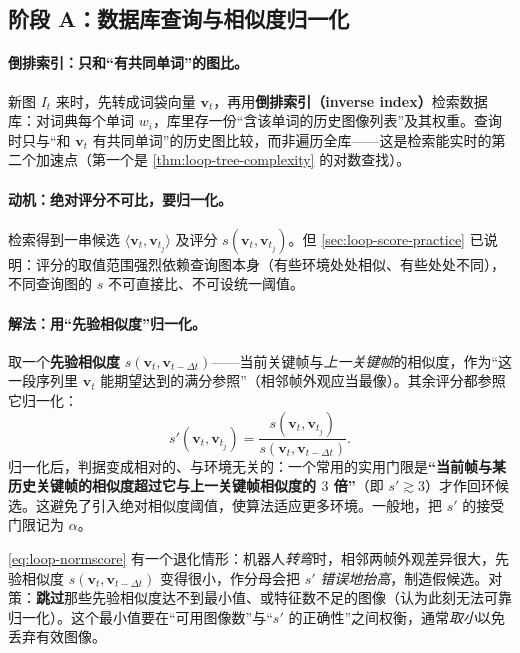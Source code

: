 \subsection{阶段 A：数据库查询与相似度归一化}
\label{sec:loop-stageA}

\paragraph{倒排索引：只和“有共同单词”的图比。}
新图 $I_t$ 来时，先转成词袋向量 $\boldsymbol v_t$，再用\textbf{倒排索引（inverse index）}检索数据库\cite{galvez2012bags}：对词典每个单词 $w_i$，库里存一份“含该单词的历史图像列表”及其权重。查询时只与“和 $\boldsymbol v_t$ 有共同单词”的历史图比较，而非遍历全库——这是检索能实时的第二个加速点（第一个是 \cref{thm:loop-tree-complexity} 的对数查找）。

\paragraph{动机：绝对评分不可比，要归一化。}
检索得到一串候选 $\langle\boldsymbol v_t,\boldsymbol v_{t_j}\rangle$ 及评分 $s(\boldsymbol v_t,\boldsymbol v_{t_j})$。但 \cref{sec:loop-score-practice} 已说明：评分的取值范围强烈依赖查询图本身（有些环境处处相似、有些处处不同），不同查询图的 $s$ 不可直接比、不可设统一阈值。

\paragraph{解法：用“先验相似度”归一化。}
取一个\textbf{先验相似度} $s(\boldsymbol v_t,\boldsymbol v_{t-\Delta t})$——当前关键帧与\emph{上一关键帧}的相似度，作为“这一段序列里 $\boldsymbol v_t$ 能期望达到的满分参照”（相邻帧外观应当最像）。其余评分都参照它归一化\cite{galvez2012bags,gaoxiang2019slam14}：
\begin{equation}
  s'(\boldsymbol v_t,\boldsymbol v_{t_j})=\frac{s(\boldsymbol v_t,\boldsymbol v_{t_j})}{s(\boldsymbol v_t,\boldsymbol v_{t-\Delta t})}.
  \label{eq:loop-normscore}
\end{equation}
归一化后，判据变成相对的、与环境无关的：一个常用的实用门限是\textbf{“当前帧与某历史关键帧的相似度超过它与上一关键帧相似度的 $3$ 倍”}（即 $s'\gtrsim 3$）才作回环候选\cite{gaoxiang2019slam14}。这避免了引入绝对相似度阈值，使算法适应更多环境。一般地，把 $s'$ 的接受门限记为 $\alpha$。

\begin{pitfall}[陷阱：转弯时先验相似度会“塌方”]
\cref{eq:loop-normscore} 有一个退化情形\cite{galvez2012bags}：机器人\emph{转弯}时，相邻两帧外观差异很大，先验相似度 $s(\boldsymbol v_t,\boldsymbol v_{t-\Delta t})$ 变得很小，作分母会把 $s'$ \emph{错误地抬高}，制造假候选。对策：\textbf{跳过}那些先验相似度达不到最小值、或特征数不足的图像（认为此刻无法可靠归一化）。这个最小值要在“可用图像数”与“$s'$ 的正确性”之间权衡，通常\emph{取小}以免丢弃有效图像。
\end{pitfall}

